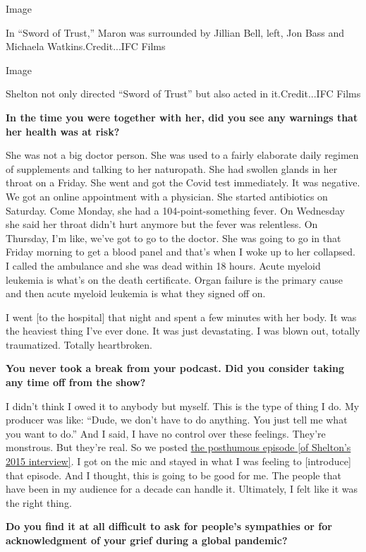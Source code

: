 Image

In ``Sword of Trust,'' Maron was surrounded by Jillian Bell, left, Jon
Bass and Michaela Watkins.Credit...IFC Films

Image

Shelton not only directed ``Sword of Trust'' but also acted in
it.Credit...IFC Films

\textbf{In the time you were together with her, did you see any warnings
that her health was at risk?}

She was not a big doctor person. She was used to a fairly elaborate
daily regimen of supplements and talking to her naturopath. She had
swollen glands in her throat on a Friday. She went and got the Covid
test immediately. It was negative. We got an online appointment with a
physician. She started antibiotics on Saturday. Come Monday, she had a
104-point-something fever. On Wednesday she said her throat didn't hurt
anymore but the fever was relentless. On Thursday, I'm like, we've got
to go to the doctor. She was going to go in that Friday morning to get a
blood panel and that's when I woke up to her collapsed. I called the
ambulance and she was dead within 18 hours. Acute myeloid leukemia is
what's on the death certificate. Organ failure is the primary cause and
then acute myeloid leukemia is what they signed off on.

I went {[}to the hospital{]} that night and spent a few minutes with her
body. It was the heaviest thing I've ever done. It was just devastating.
I was blown out, totally traumatized. Totally heartbroken.

\textbf{You never took a break from your podcast. Did you consider
taking any time off from the show?}

I didn't think I owed it to anybody but myself. This is the type of
thing I do. My producer was like: ``Dude, we don't have to do anything.
You just tell me what you want to do.'' And I said, I have no control
over these feelings. They're monstrous. But they're real. So we posted
\href{http://www.wtfpod.com/podcast/in-memoriam-remembering-lynn-shelton}{the
posthumous episode {[}of Shelton's 2015 interview{]}}. I got on the mic
and stayed in what I was feeling to {[}introduce{]} that episode. And I
thought, this is going to be good for me. The people that have been in
my audience for a decade can handle it. Ultimately, I felt like it was
the right thing.

\textbf{Do you find it at all difficult to ask for people's sympathies
or for acknowledgment of your grief during a global pandemic?}

